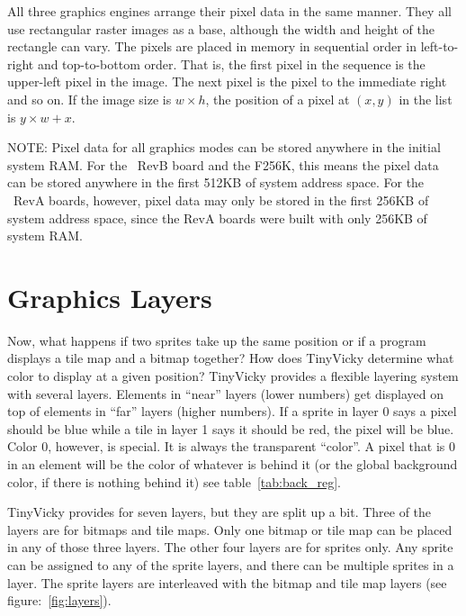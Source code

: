 All three graphics engines arrange their pixel data in the same manner. They all use rectangular raster images as a base, although the width and height of the rectangle can vary. The pixels are placed in memory in sequential order in left-to-right and top-to-bottom order. That is, the first pixel in the sequence is the upper-left pixel in the image. The next pixel is the pixel to the immediate right and so on. If the image size is $w \times h$, the position of a pixel at $(x, y)$ in the list is $y \times w + x$.

\begin{leftbar}
NOTE: Pixel data for all graphics modes can be stored anywhere in the initial system RAM. For the \jr\ RevB board and the F256K, this means the pixel data can be stored anywhere in the first 512KB of system address space. For the \jr\ RevA boards, however, pixel data may only be stored in the first 256KB of system address space, since the RevA boards were built with only 256KB of system RAM.
\end{leftbar}

\section*{Graphics Layers}

Now, what happens if two sprites take up the same position or if a program displays a tile map and a bitmap together? How does TinyVicky determine what color to display at a given position? TinyVicky provides a flexible layering system with several layers. Elements in ``near'' layers (lower numbers) get displayed on top of elements in ``far'' layers (higher numbers). If a sprite in layer 0 says a pixel should be blue while a tile in layer 1 says it should be red, the pixel will be blue. Color 0, however, is special. It is always the transparent ``color''. A pixel that is 0 in an element will be the color of whatever is behind it (or the global background color, if there is nothing behind it) see table~\ref{tab:back_reg}.

TinyVicky provides for seven layers, but they are split up a bit. Three of the layers are for bitmaps and tile maps. Only one bitmap or tile map can be placed in any of those three layers. The other four layers are for sprites only. Any sprite can be assigned to any of the sprite layers, and there can be multiple sprites in a layer. The sprite layers are interleaved with the bitmap and tile map layers (see figure:~\ref{fig:layers}).

